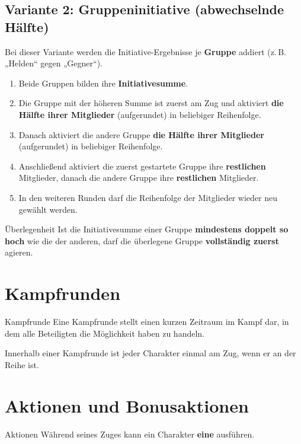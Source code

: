 \subsection*{Variante 2: Gruppeninitiative (abwechselnde Hälfte)}
Bei dieser Variante werden die Initiative-Ergebnisse je \textbf{Gruppe} addiert
(z.\,B. „Helden“ gegen „Gegner“).

\begin{enumerate}
	\item Beide Gruppen bilden ihre \textbf{Initiativesumme}.
	\item Die Gruppe mit der höheren Summe ist zuerst am Zug und aktiviert
	\textbf{die Hälfte ihrer Mitglieder} (aufgerundet) in beliebiger Reihenfolge.
	\item Danach aktiviert die andere Gruppe \textbf{die Hälfte ihrer Mitglieder}
	(aufgerundet) in beliebiger Reihenfolge.
	\item Anschließend aktiviert die zuerst gestartete Gruppe ihre \textbf{restlichen}
	Mitglieder, danach die andere Gruppe ihre \textbf{restlichen} Mitglieder.
	\item In den weiteren Runden darf die Reihenfolge der Mitglieder wieder neu gewählt werden.
\end{enumerate}

\begin{rulebox}{Überlegenheit}
	Ist die Initiativesumme einer Gruppe \textbf{mindestens doppelt so hoch} wie die
	der anderen, darf die überlegene Gruppe \textbf{vollständig zuerst} agieren.
\end{rulebox}
 

\section{Kampfrunden}

\begin{rulebox}{Kampfrunde}
	Eine Kampfrunde stellt einen kurzen Zeitraum im Kampf dar, in dem alle
	Beteiligten die Möglichkeit haben zu handeln.
\end{rulebox}

Innerhalb einer Kampfrunde ist jeder Charakter einmal am Zug, wenn er an der
Reihe ist.

\section{Aktionen und Bonusaktionen}

\begin{rulebox}{Aktionen}
	Während seines Zuges kann ein Charakter \textbf{eine}  ausführen.
\end{rulebox}

